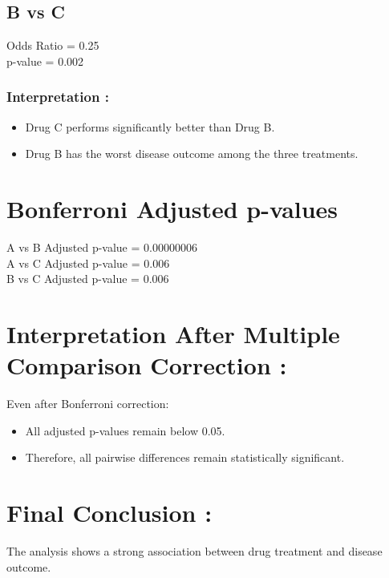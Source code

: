 \documentclass[
]{article}
\begin{document}
\subsection{B vs C}\label{b-vs-c}

Odds Ratio = 0.25\\
p-value = 0.002

\subsubsection{Interpretation :}\label{interpretation-14}

\begin{itemize}
\item
  Drug C performs significantly better than Drug B.
\item
  Drug B has the worst disease outcome among the three treatments.
\end{itemize}

\section{Bonferroni Adjusted
p-values}\label{bonferroni-adjusted-p-values}

A vs B Adjusted p-value = 0.00000006\\
A vs C Adjusted p-value = 0.006\\
B vs C Adjusted p-value = 0.006

\section{\texorpdfstring{\textbf{Interpretation After Multiple
Comparison Correction
:}}{Interpretation After Multiple Comparison Correction :}}\label{interpretation-after-multiple-comparison-correction}

Even after Bonferroni correction:

\begin{itemize}
\item
  All adjusted p-values remain below 0.05.
\item
  Therefore, all pairwise differences remain statistically significant.
\end{itemize}

\section{Final Conclusion :}\label{final-conclusion-2}

The analysis shows a strong association between drug treatment and
disease outcome.
\end{document}
